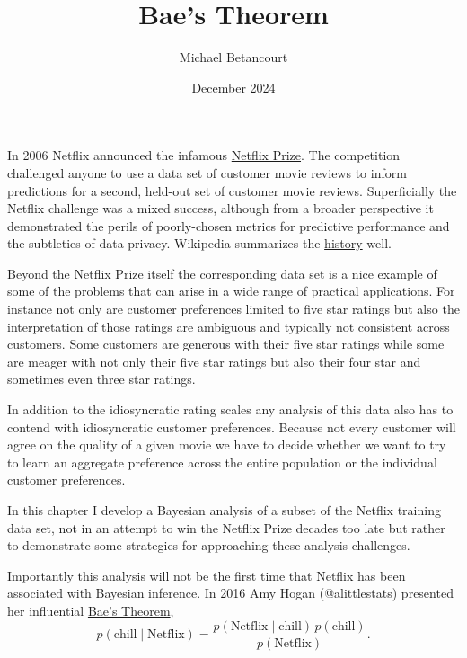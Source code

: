 \documentclass[
  letterpaper,
  DIV=11,
  numbers=noendperiod]{scrartcl}
\title{Bae's Theorem}
\author{Michael Betancourt}
\date{December 2024}
\renewcommand*\contentsname{Table of contents}
\newcommand\contentsname{Table of contents}
\begin{document}
\maketitle

\renewcommand*\contentsname{Table of contents}
{
\hypersetup{linkcolor=}
\setcounter{tocdepth}{3}
\tableofcontents
}
In 2006 Netflix announced the infamous
\href{https://web.archive.org/web/20200510213032/https://www.netflixprize.com/assets/rules.pdf}{Netflix
Prize}. The competition challenged anyone to use a data set of customer
movie reviews to inform predictions for a second, held-out set of
customer movie reviews. Superficially the Netflix challenge was a mixed
success, although from a broader perspective it demonstrated the perils
of poorly-chosen metrics for predictive performance and the subtleties
of data privacy. Wikipedia summarizes the
\href{https://en.wikipedia.org/wiki/Netflix_Prize}{history} well.

Beyond the Netflix Prize itself the corresponding data set is a nice
example of some of the problems that can arise in a wide range of
practical applications. For instance not only are customer preferences
limited to five star ratings but also the interpretation of those
ratings are ambiguous and typically not consistent across customers.
Some customers are generous with their five star ratings while some are
meager with not only their five star ratings but also their four star
and sometimes even three star ratings.

In addition to the idiosyncratic rating scales any analysis of this data
also has to contend with idiosyncratic customer preferences. Because not
every customer will agree on the quality of a given movie we have to
decide whether we want to try to learn an aggregate preference across
the entire population or the individual customer preferences.

In this chapter I develop a Bayesian analysis of a subset of the Netflix
training data set, not in an attempt to win the Netflix Prize decades
too late but rather to demonstrate some strategies for approaching these
analysis challenges.

Importantly this analysis will not be the first time that Netflix has
been associated with Bayesian inference. In 2016 Amy Hogan
(@alittlestats) presented her influential
\href{https://twitter.com/alittlestats/status/664923862853922820}{Bae's
Theorem}, \[
p( \text{chill} \mid \text{Netflix} )
=
\frac{ p( \text{Netflix} \mid \text{chill} ) \, p( \text{chill} ) }
{ p( \text{Netflix} ) }.
\]
\end{document}
